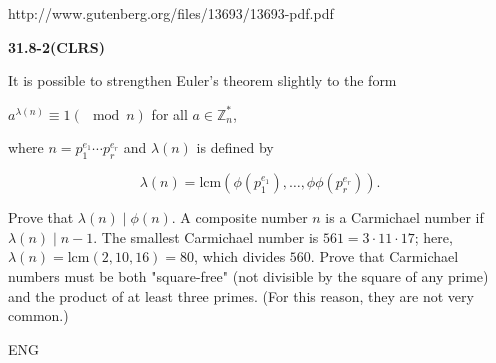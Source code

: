 http://www.gutenberg.org/files/13693/13693-pdf.pdf
    

\textbf{31.8-2(CLRS)}

It is possible to strengthen Euler's theorem slightly to the form

$a^{\lambda(n)} \equiv 1 (\mod n)$ for all $a \in \mathbb Z_n^*$,

where $n = p_1^{e_1} \cdots p_r^{e_r}$ and $\lambda(n)$ is defined by

$$\lambda(n) = \text{lcm}(\phi(p_1^{e_1}), \ldots, \phi\phi(p_r^{e_r})). $$

Prove that $\lambda(n) \mid \phi(n)$. A composite number $n$ is a Carmichael number if $\lambda(n) \mid n - 1$. The smallest Carmichael number is $561 = 3 \cdot 11 \cdot 17$; here, $\lambda(n) = \text{lcm}(2, 10, 16) = 80$, which divides $560$. Prove that Carmichael numbers must be both "square-free" (not divisible by the square of any prime) and the product of at least three primes. (For this reason, they are not very common.)

ENG

